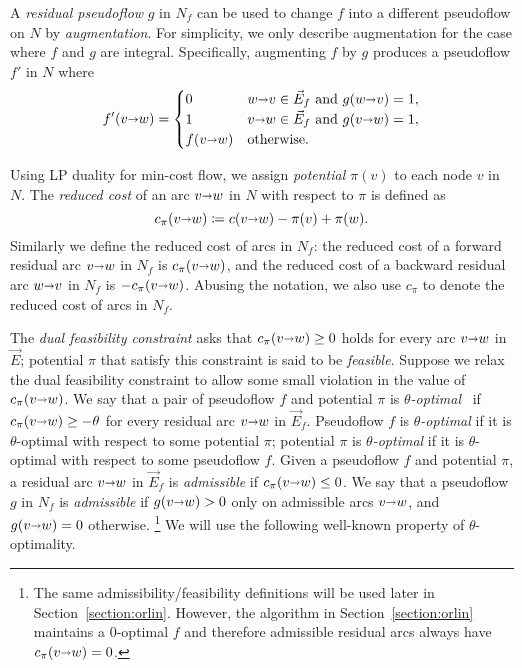 \documentclass[11pt]{article}
\makeatletter
\def\eps{\varepsilon}
\def\arcto{\mathord\shortrightarrow}
\def\arc#1#2{#1\arcto#2}
\theoremstyle{plain}
\numberwithin{figure}{section}
\def\EMPH#1{\textcolor{BrickRed}{{\emph{#1}}}}
\def\n@te#1{\textsf{\boldmath \textbf{$\langle\!\langle$#1$\rangle\!\rangle$}}\leavevmode}
\def\note#1{\textcolor{red}{\n@te{#1}}}
\makeatother
\begin{document}
A \EMPH{residual pseudoflow} $g$ in $N_f$ can be used to change $f$ into a
different pseudoflow on $N$ by \EMPH{augmentation}.
For simplicity, we only describe augmentation for the case where $f$ and $g$ are integral.
Specifically, augmenting $f$ by $g$ produces a pseudoflow $f'$ in $N$ where
\[
f'(\arc vw) = \begin{cases}
	0 & {\arc wv} \in \vec{E}_f \text{ and } g(\arc wv) = 1, \\
	1 & {\arc vw} \in \vec{E}_f \text{ and } g(\arc vw) = 1, \\
	f(\arc vw) & \text{otherwise.}
\end{cases}
\]

Using LP duality for min-cost flow, we assign \EMPH{potential $\pi(v)$} to each node $v$ in $N$.
The \EMPH{reduced cost} of an arc $\arc{v}{w}$ in $N$ with respect to $\pi$ is
defined as
\[
c_\pi(\arc vw) \coloneqq c(\arc vw) - \pi(v) + \pi(w).
\]
Similarly we define the reduced cost of arcs in $N_f$: the reduced cost of a
forward residual arc $\arc vw$ in $N_f$ is $c_\pi(\arc vw)$, and the reduced cost of a
backward residual arc $\arc wv$ in $N_f$ is $-c_\pi(\arc vw)$.
Abusing the notation, we also use $c_\pi$ to denote the reduced cost of arcs in
$N_f$.

The \EMPH{dual feasibility constraint} asks that $c_\pi(\arc vw) \geq 0$ holds
for every arc $\arc vw$ in $\vec{E}$;
potential $\pi$ that satisfy this constraint is said to be \EMPH{feasible}.
Suppose we relax the dual feasibility constraint to allow some small violation
in the value of $c_\pi(\arc vw)$.
We say that a pair of pseudoflow $f$ and potential $\pi$ is
\EMPH{$\theta$-optimal}~\cite{T85,BE87}
if $c_\pi(\arc vw) \geq -\theta$ for every residual arc $\arc vw$ in $\vec{E}_f$.
Pseudoflow $f$ is \emph{$\theta$-optimal} if it is $\theta$-optimal with
respect to some potential $\pi$;
potential $\pi$ is \emph{$\theta$-optimal} if it is $\theta$-optimal with
respect to some pseudoflow $f$.
Given a pseudoflow $f$ and potential $\pi$, a residual arc $\arc vw$ in
$\vec{E}_f$ is \EMPH{admissible} if $c_\pi(\arc vw) \leq 0$.
We say that a pseudoflow $g$ in $N_f$ is \EMPH{admissible} if $g(\arc vw) > 0$
only on admissible arcs $\arc vw$, and $g(\arc vw) = 0$ otherwise.%
\footnote{The same admissibility/feasibility definitions will be used later in
	Section~\ref{section:orlin}.
	However, the algorithm in Section~\ref{section:orlin} maintains a
	0-optimal $f$ and therefore admissible residual arcs always have
	$c_\pi(\arc vw) = 0$.}
We will use the following well-known property of $\theta$-optimality.
\end{document}
